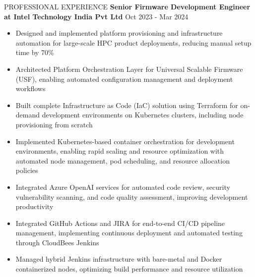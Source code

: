 \documentclass{resume} %
\begin{document}
\begin{rSection}{PROFESSIONAL EXPERIENCE}
{\textbf{Senior Firmware Development Engineer at Intel Technology India Pvt Ltd}}  \hfill {Oct 2023 - Mar 2024}
\begin{itemize}
    \item Designed and implemented platform provisioning and infrastructure automation for large-scale HPC product deployments, reducing manual setup time by 70\%
    \item Architected Platform Orchestration Layer for Universal Scalable Firmware (USF), enabling automated configuration management and deployment workflows
    \item Built complete Infrastructure as Code (IaC) solution using Terraform for on-demand development environments on Kubernetes clusters, including node provisioning from scratch
    \item Implemented Kubernetes-based container orchestration for development environments, enabling rapid scaling and resource optimization with automated node management, pod scheduling, and resource allocation policies
    \item Integrated Azure OpenAI services for automated code review, security vulnerability scanning, and code quality assessment, improving development productivity
    \item Integrated GitHub Actions and JIRA for end-to-end CI/CD pipeline management, implementing continuous deployment and automated testing through CloudBees Jenkins
    \item Managed hybrid Jenkins infrastructure with bare-metal and Docker containerized nodes, optimizing build performance and resource utilization
\end{itemize}
 

\end{rSection}
\end{document}
